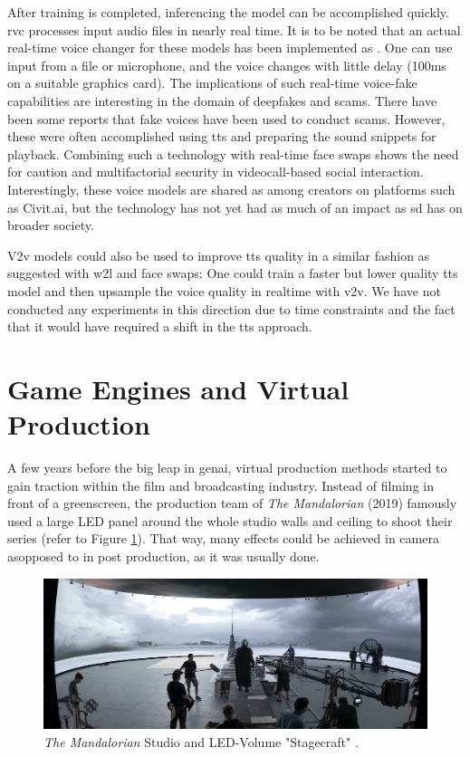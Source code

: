 \documentclass[
  a4paper,  %
  twoside,  %
  bibliography=totoc,
  headsepline,
  cleardoublepage=empty,
  parskip=half,
  draft=false
]{scrbook}
\begin{document}
After training is completed, inferencing the model can be accomplished quickly. \gls{rvc} processes input audio files in nearly real time. It is to be noted that an actual real-time voice changer for these models has been implemented as  \cite{WokadaVoicechangerVoice}. One can use input from a file or microphone, and the voice changes with little delay (100ms on a suitable graphics card). The implications of such real-time voice-fake capabilities are interesting in the domain of deepfakes and scams. There have been some reports that fake voices have been used to conduct scams. However, these were often accomplished using \gls{tts} and preparing the sound snippets for playback. Combining such a technology with real-time face swaps shows the need for caution and multifactorial security in videocall-based social interaction. Interestingly, these voice models are shared as among creators on platforms such as Civit.ai, but the technology has not yet had as much of an impact as \gls{sd} has on broader society.

V2v models could also be used to improve \gls{tts} quality in a similar fashion as suggested with \gls{w2l} and face swaps: One could train a faster but lower quality \gls{tts} model and then upsample the voice quality in realtime with \gls{v2v}. We have not conducted any experiments in this direction due to time constraints and the fact that it would have required a shift in the \gls{tts} approach.

\section{Game Engines and Virtual Production}
\label{sec:bg-virtual-production}
A few years before the big leap in \gls{genai}, virtual production methods started to gain traction within the film and broadcasting industry. Instead of filming in front of a greenscreen, the production team of \textit{The Mandalorian} (2019) famously used a large LED panel around the whole studio walls and ceiling to shoot their series (refer to Figure \ref{fig:mando-vps}). That way, many effects could be achieved in camera asopposed to in post production, as it was usually done.

\begin{figure}[h]
  \centering
  \includegraphics[width=1\textwidth]{./graphics/mandalorian-vp.jpg}
  \caption{\textit{The Mandalorian} Studio and LED-Volume "Stagecraft" \cite{landsiedelGamechanger2021}.}
  \label{fig:mando-vps}
\end{figure}
\end{document}
